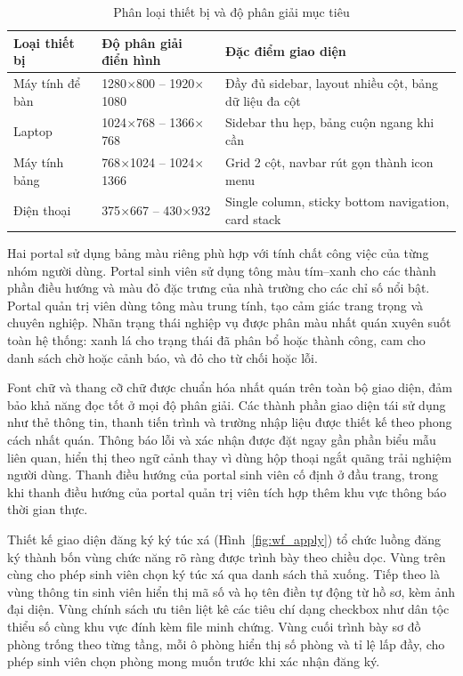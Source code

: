 \documentclass[../DoAn.tex]{subfiles}
\begin{document}
\begin{table}[H]
\centering
\caption{Phân loại thiết bị và độ phân giải mục tiêu}
\label{tab:device_targets}
\small
\begin{tabular}{|p{2.6cm}|p{4.4cm}|p{5.6cm}|}
\hline
\textbf{Loại thiết bị} & \textbf{Độ phân giải điển hình} & \textbf{Đặc điểm giao diện} \\
\hline
Máy tính để bàn & 1280$\times$800 -- 1920$\times$1080 & Đầy đủ sidebar, layout nhiều cột, bảng dữ liệu đa cột \\
\hline
Laptop & 1024$\times$768 -- 1366$\times$768 & Sidebar thu hẹp, bảng cuộn ngang khi cần \\
\hline
Máy tính bảng & 768$\times$1024 -- 1024$\times$1366 & Grid 2 cột, navbar rút gọn thành icon menu \\
\hline
Điện thoại & 375$\times$667 -- 430$\times$932 & Single column, sticky bottom navigation, card stack \\
\hline
\end{tabular}
\end{table}

Hai portal sử dụng bảng màu riêng phù hợp với tính chất công việc của từng
nhóm người dùng. Portal sinh viên sử dụng tông màu tím--xanh cho các thành
phần điều hướng và màu đỏ đặc trưng của nhà trường cho các chỉ số nổi bật.
Portal quản trị viên dùng tông màu trung tính, tạo cảm giác trang trọng và
chuyên nghiệp. Nhãn trạng thái nghiệp vụ được phân màu nhất quán xuyên suốt
toàn hệ thống: xanh lá cho trạng thái đã phân bổ hoặc thành công, cam cho
danh sách chờ hoặc cảnh báo, và đỏ cho từ chối hoặc lỗi.

Font chữ và thang cỡ chữ được chuẩn hóa nhất quán trên toàn bộ giao diện,
đảm bảo khả năng đọc tốt ở mọi độ phân giải. Các thành phần giao diện tái
sử dụng như thẻ thông tin, thanh tiến trình và trường nhập liệu được thiết kế
theo phong cách nhất quán. Thông báo lỗi và xác nhận được đặt ngay gần phần
biểu mẫu liên quan, hiển thị theo ngữ cảnh thay vì dùng hộp thoại ngắt quãng
trải nghiệm người dùng. Thanh điều hướng của portal sinh viên cố định ở đầu
trang, trong khi thanh điều hướng của portal quản trị viên tích hợp thêm khu
vực thông báo thời gian thực.


Thiết kế giao diện đăng ký ký túc xá (Hình~\ref{fig:wf_apply}) tổ chức luồng
đăng ký thành bốn vùng chức năng rõ ràng được trình bày theo chiều dọc. Vùng
trên cùng cho phép sinh viên chọn ký túc xá qua danh sách thả xuống. Tiếp theo
là vùng thông tin sinh viên hiển thị mã số và họ tên điền tự động từ hồ sơ,
kèm ảnh đại diện. Vùng chính sách ưu tiên liệt kê các tiêu chí dạng checkbox
như dân tộc thiểu số cùng khu vực đính kèm file minh chứng. Vùng cuối trình
bày sơ đồ phòng trống theo từng tầng, mỗi ô phòng hiển thị số phòng và tỉ lệ
lấp đầy, cho phép sinh viên chọn phòng mong muốn trước khi xác nhận đăng ký.
\end{document}
